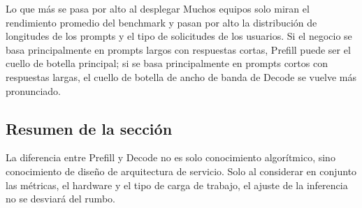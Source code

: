 \begin{knowledgebox}{Lo que más se pasa por alto al desplegar}
Muchos equipos solo miran el rendimiento promedio del benchmark y pasan por alto la distribución de longitudes de los prompts y el tipo de solicitudes de los usuarios. Si el negocio se basa principalmente en prompts largos con respuestas cortas, Prefill puede ser el cuello de botella principal; si se basa principalmente en prompts cortos con respuestas largas, el cuello de botella de ancho de banda de Decode se vuelve más pronunciado.
\end{knowledgebox}

\subsection{Resumen de la sección}
La diferencia entre Prefill y Decode no es solo conocimiento algorítmico, sino conocimiento de diseño de arquitectura de servicio. Solo al considerar en conjunto las métricas, el hardware y el tipo de carga de trabajo, el ajuste de la inferencia no se desviará del rumbo.

\newpage
